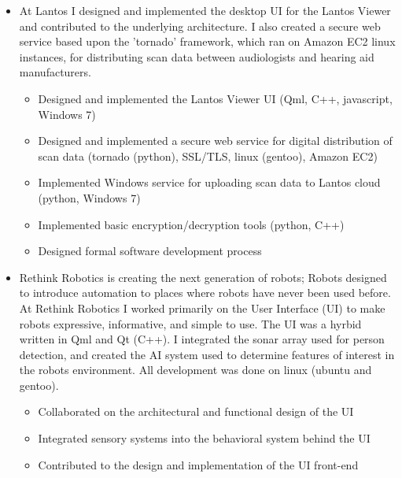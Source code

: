 \documentclass[11pt,a4paper,sans]{moderncv}        %
\begin{document}
\begin{itemize}

  \item{}

    At Lantos I designed and implemented the desktop UI for the Lantos Viewer
    and contributed to the underlying architecture. I also created a secure web
    service based upon the 'tornado' framework, which ran on Amazon EC2 linux
    instances, for distributing scan data between audiologists and hearing aid
    manufacturers.

    \begin{itemize}
      \item{Designed and implemented the Lantos Viewer UI (Qml, C++, javascript, Windows 7)}
      \item{Designed and implemented a secure web service for digital distribution of scan data (tornado (python), SSL/TLS, linux (gentoo), Amazon EC2)}
      \item{Implemented Windows service for uploading scan data to Lantos cloud (python, Windows 7)}
      \item{Implemented basic encryption/decryption tools (python, C++)}
      \item{Designed formal software development process}
    \end{itemize}

\end{itemize}


\vspace{6pt}

\begin{itemize}

  \item{}

    Rethink Robotics is creating the next generation of robots; Robots designed
    to introduce automation to places where robots have never been used before.
    At Rethink Robotics I worked primarily on the User Interface (UI) to make
    robots expressive, informative, and simple to use. The UI was a hyrbid
    written in Qml and Qt (C++). I integrated the sonar array used for person
    detection, and created the AI system used to determine features of interest
    in the robots environment. All development was done on linux (ubuntu and
    gentoo).

    \begin{itemize}
      \item{Collaborated on the architectural and functional design of the UI}
      \item{Integrated sensory systems into the behavioral system behind the UI}
      \item{Contributed to the design and implementation of the UI front-end}
    \end{itemize}

\end{itemize}
\end{document}

